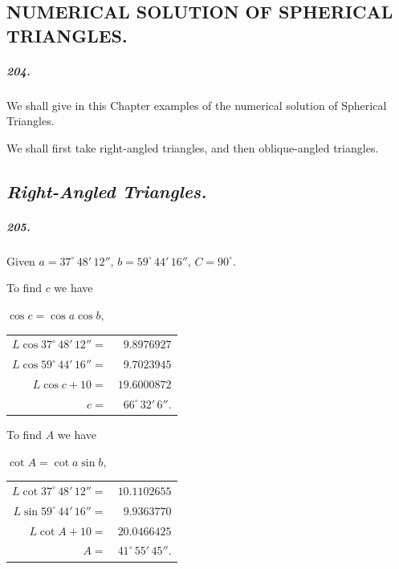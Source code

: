 \documentclass{book}[2004/02/16]
\begin{document}
\begin{mainmatter}
\begin{spacing}{1.3}
\chapter[Numerical Solution of Spherical Triangles.]{NUMERICAL SOLUTION OF SPHERICAL TRIANGLES.}

\paragraph{204.} We shall give in this Chapter examples of the numerical
solution of Spherical Triangles.

We shall first take right-angled triangles, and then oblique-angled
triangles.

\section*{\centering\normalfont\large%
\textit{Right-Angled Triangles.}}

\paragraph{205.} Given $a = 37^\circ\, 48'\, 12''$, $b = 59^\circ\, 44'\, 16''$, $C = 90^\circ$.

To find $c$ we have
\begin{center}
$\cos c = \cos a \cos b,$\\[.1ex]
\begin{tabular}{rr@{}}
$L \cos 37^\circ\, 48'\, 12'' =$ & $9.8976927$ \\
$L \cos 59^\circ\, 44'\, 16'' =$ & $9.7023945$ \\
\cline{2-2}
$L \cos c + 10 =$ & $19.6000872$\\
$c =$ & $66^\circ\, 32'\, 6''$.
\end{tabular}
\end{center}

To find $A$ we have
\begin{center}
$\cot A = \cot a \sin b,$\\[.5ex]
\begin{tabular}{rr@{}}
$L \cot 37^\circ\, 48'\, 12'' =$ & $10.1102655$ \\
$L \sin 59^\circ\, 44'\, 16'' =$ & $ 9.9363770$ \\
\cline{2-2}
$L \cot A + 10 =$ & $ 20.0466425$\\
$A =$ & $41^\circ\, 55'\, 45''$.
\end{tabular}
\end{center}


\end{spacing}
\end{mainmatter}
\end{document}
